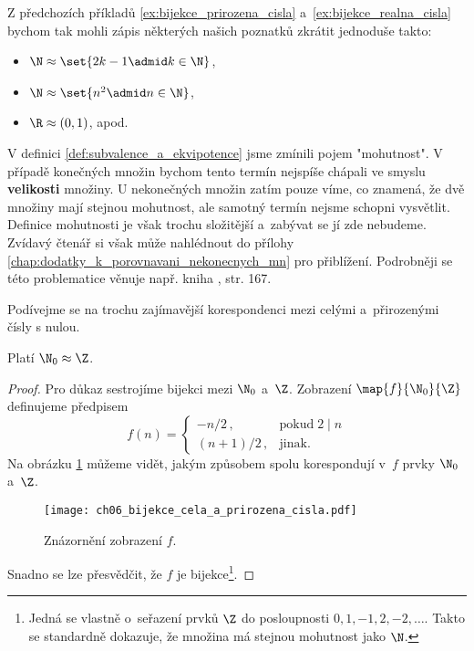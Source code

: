 Z předchozích příkladů \ref{ex:bijekce_prirozena_cisla} a~\ref{ex:bijekce_realna_cisla} bychom tak mohli zápis některých našich poznatků zkrátit jednoduše takto:
\begin{itemize}
    \item $\N\approx\set{2k-1\admid k\in\N}$,
    \item $\N\approx\set{n^2\admid n\in\N}$,
    \item $\R\approx(0,1)$, apod.
\end{itemize}
V definici \ref{def:subvalence_a_ekvipotence} jsme zmínili pojem "mohutnost". V případě konečných množin bychom tento termín nejspíše chápali ve smyslu \textbf{velikosti} množiny. U nekonečných množin zatím pouze víme, co znamená, že dvě množiny mají stejnou mohutnost, ale samotný termín nejsme schopni vysvětlit. Definice mohutnosti je však trochu složitější a~zabývat se jí zde nebudeme. Zvídavý čtenář si však může nahlédnout do přílohy \ref{chap:dodatky_k_porovnavani_nekonecnych_mn} pro přiblížení. Podrobněji se této problematice věnuje např. kniha \cite{Potter2009}, str. 167.\par
Podívejme se na trochu zajímavější korespondenci mezi celými a~přirozenými čísly s nulou.
\begin{theorem}\label{thm:N_a_Z}
    Platí $\N_0\approx\Z$.
\end{theorem}
\begin{proof}
    Pro důkaz sestrojíme bijekci mezi $\N_0$ a~$\Z$. Zobrazení $\map{f}{\N_0}{\Z}$ definujeme předpisem
    \begin{equation*}
        f(n)=\left\{
        \begin{array}{ll}
            -n/2\,, & \text{pokud}\;2\mid n\\
            (n+1)/2\,, & \text{jinak}.
        \end{array}
        \right.
    \end{equation*}
    Na obrázku \ref{fig:bijekce_cela_a_prirozena_cisla} můžeme vidět, jakým způsobem spolu korespondují v~$f$ prvky $\N_0$ a~$\Z$.
    \begin{figure}[H]
        \centering
        \texttt{[image: ch06\_bijekce\_cela\_a\_prirozena\_cisla.pdf]}
        \caption{Znázornění zobrazení $f$.}
        \label{fig:bijekce_cela_a_prirozena_cisla}
    \end{figure}
    Snadno se lze přesvědčit, že $f$ je bijekce\footnote{Jedná se vlastně o~seřazení prvků $\Z$ do posloupnosti $0,1,-1,2,-2,\dots$. Takto se standardně dokazuje, že množina má stejnou mohutnost jako $\N$.}.
\end{proof}
